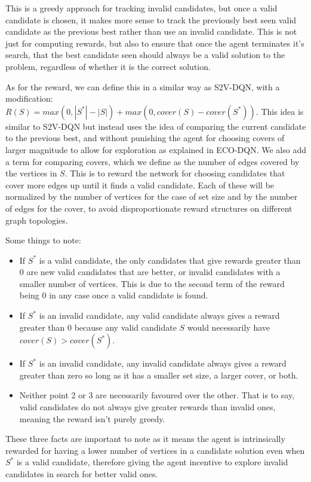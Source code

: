 \documentclass{article}
\begin{document}
This is a greedy approach for tracking invalid candidates, but once a valid candidate is chosen, it makes more sense to track the previously best seen valid candidate as the previous best rather than use an invalid candidate. This is not just for computing rewards, but also to ensure that once the agent terminates it's search, that the best candidate seen should always be a valid solution to the problem, regardless of whether it is the correct solution.

As for the reward, we can define this in a similar way as S2V-DQN, with a modification: $R(S) = max(0, |S^*| - |S|) + max(0, cover(S) - cover(S^*))$. This idea is similar to S2V-DQN but instead uses the idea of comparing the current candidate to the previous best, and without punishing the agent for choosing covers of larger magnitude to allow for exploration as explained in ECO-DQN. We also add a term for comparing covers, which we define as the number of edges covered by the vertices in $S$. This is to reward the network for choosing candidates that cover more edges up until it finds a valid candidate. Each of these will be normalized by the number of vertices for the case of set size and by the number of edges for the cover, to avoid disproportionate reward structures on different graph topologies. 

Some things to note:

\begin{itemize}
    \item If $S^*$ is a valid candidate, the only candidates that give rewards greater than 0 are new valid candidates that are better, or invalid candidates with a smaller number of vertices. This is due to the second term of the reward being 0 in any case once a valid candidate is found.
    \item If $S^*$ is an invalid candidate, any valid candidate always gives a reward greater than 0 because any valid candidate $S$ would necessarily have $cover(S) > cover(S^*)$. 
    \item If $S^*$ is an invalid candidate, any invalid candidate always gives a reward greater than zero so long as it has a smaller set size, a larger cover, or both.
    \item Neither point 2 or 3 are necessarily favoured over the other. That is to say, valid candidates do not always give greater rewards than invalid ones, meaning the reward isn't purely greedy.
\end{itemize}

These three facts are important to note as it means the agent is intrinsically rewarded for having a lower number of vertices in a candidate solution even when $S^*$ is a valid candidate, therefore giving the agent incentive to explore invalid candidates in search for better valid ones.
\end{document}
